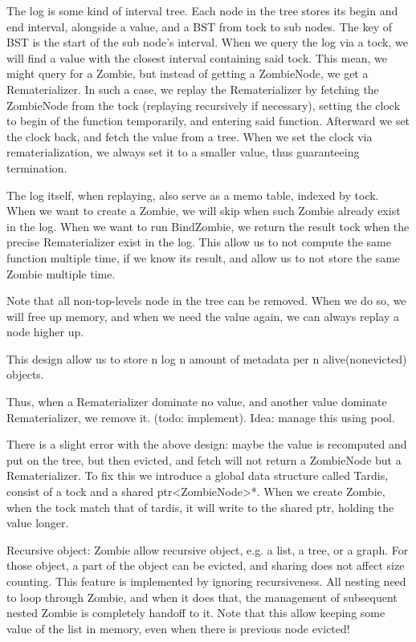 \documentclass[acmsmall]{acmart}
\begin{document}
	The log is some kind of interval tree. Each node in the tree stores its begin and end interval, alongside a value, and a BST from tock to sub nodes. The key of BST is the start of the sub node’s interval. When we query the log via a tock, we will find a value with the closest interval containing said tock. This mean, we might query for a Zombie, but instead of getting a ZombieNode, we get a Rematerializer.
	In such a case, we replay the Rematerializer by fetching the ZombieNode from the tock (replaying recursively if necessary), setting the clock to begin of the function temporarily, and entering said function. Afterward we set the clock back, and fetch the value from a tree.
	When we set the clock via rematerialization, we always set it to a smaller value, thus guaranteeing termination.
	
	The log itself, when replaying, also serve as a memo table, indexed by tock. When we want to create a Zombie, we will skip when such Zombie already exist in the log. When we want to run BindZombie, we return the result tock when the precise Rematerializer exist in the log. This allow us to not compute the same function multiple time, if we know its result, and allow us to not store the same Zombie multiple time.
	
	Note that all non-top-levels node in the tree can be removed. When we do so, we will free up memory, and when we need the value again, we can always replay a node higher up.
	
	This design allow us to store n log n amount of metadata per n alive(nonevicted) objects.
	
	Thus, when a Rematerializer dominate no value, and another value dominate Rematerializer, we remove it. (todo: implement). Idea: manage this using pool.
	
	There is a slight error with the above design: maybe the value is recomputed and put on the tree, but then evicted, and fetch will not return a ZombieNode but a Rematerializer. To fix this we introduce a global data structure called Tardis, consist of a tock and a shared ptr<ZombieNode>*. When we create Zombie, when the tock match that of tardis, it will write to the shared ptr, holding the value longer.
	
	Recursive object:
	Zombie allow recursive object, e.g. a list, a tree, or a graph.
	For those object, a part of the object can be evicted, and sharing does not affect size counting.
	This feature is implemented by ignoring recursiveness. All nesting need to loop through Zombie, and when it does that, the management of subsequent nested Zombie is completely handoff to it.
	Note that this allow keeping some value of the list in memory, even when there is previous node evicted!
	
\appendix
\end{document}
